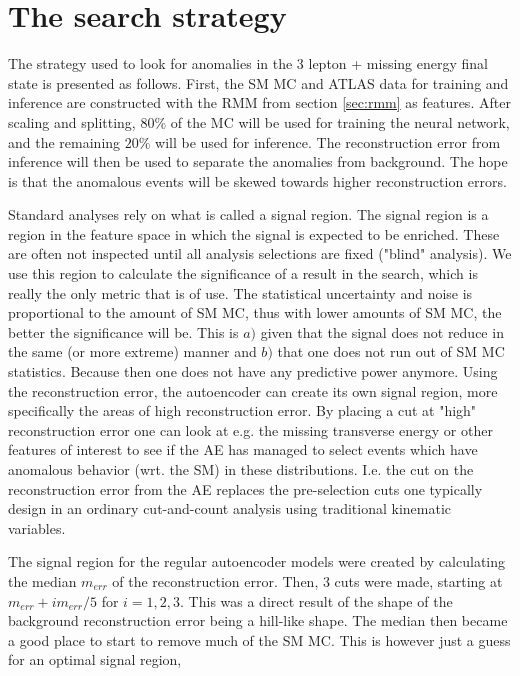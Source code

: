 \section{The search strategy}\label{sec:strategy}
The strategy used to look for anomalies in the 3 lepton + missing energy final state is presented as follows. 
First, the SM MC and ATLAS data for training and inference are constructed with the RMM from section 
\ref{sec:rmm} as features. After scaling and splitting, $80\%$ of the MC will be used for training the neural 
network, and the remaining $20\%$ will be used for inference. The reconstruction error 
from inference will then be used to separate the anomalies from background. The hope is that the anomalous events will 
be skewed towards higher reconstruction errors.\par
Standard analyses rely on what is called a signal region. The signal region is a region in the feature space in which
the signal is expected to be enriched. These are often not inspected until all analysis selections are fixed ("blind" analysis). 
We use this region to calculate the significance of a result in the search, which is 
really the only metric that is of use. 
The statistical uncertainty and noise is proportional to the amount of SM MC, 
thus with lower amounts of SM MC, the better the significance will be. This is $a)$ 
given that the signal does not reduce in the same (or more extreme) manner  and $b)$ 
that one does not run out of SM MC statistics. Because then one does not have any predictive power anymore.
Using the reconstruction error, the autoencoder 
can create its own signal region, more specifically the areas of high reconstruction error. 
By placing a cut at "high" reconstruction error one can look at e.g. the missing transverse energy or other 
features of interest to see if the AE has managed to select events which have anomalous behavior (wrt. the SM) 
in these distributions. I.e. the cut on the reconstruction error from the AE replaces the pre-selection cuts one 
typically design in an ordinary cut-and-count analysis using traditional kinematic variables.\par 
The signal region for the regular autoencoder models were created by calculating the median $m_{err}$ of the 
reconstruction error. Then, 3 cuts were made, starting at $m_{err} + im_{err}/5$ for $i = 1,2,3$. This was a direct 
result of the shape of the background reconstruction error being a hill-like shape. The median then became a 
good place to start to remove much of the SM MC. This is however just a guess for an optimal signal region, 
